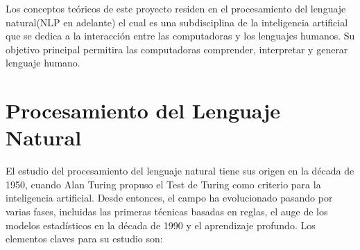 
Los conceptos teóricos de este proyecto residen en el procesamiento del lenguaje natural(NLP en adelante) el cual es una subdisciplina de la inteligencia artificial que se dedica a la interacción entre las computadoras y los lenguajes humanos. Su objetivo principal permitira las computadoras comprender, interpretar y generar lenguaje humano.

\section{Procesamiento del Lenguaje Natural}\label{NLP}

El estudio del procesamiento del lenguaje natural tiene sus origen en la década de 1950, cuando Alan Turing propuso el Test de Turing como criterio para la inteligencia artificial. Desde entonces, el campo ha evolucionado pasando por varias fases, incluidas las primeras técnicas basadas en reglas, el auge de los modelos estadísticos en la década de 1990 y el aprendizaje profundo. Los elementos claves para su estudio son:

